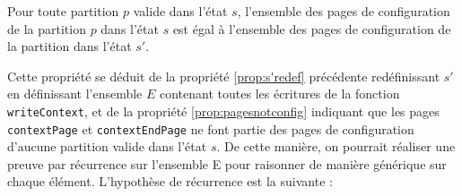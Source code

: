 			\begin{theorem}
				\label{prop:sameconfigpages}
				Pour toute partition $p$ valide dans l'état $s$, l'ensemble des pages de configuration de la partition $p$ dans l'état $s$ est égal à l'ensemble des pages de configuration de la partition dans l'état $s'$.
			\end{theorem}

			Cette propriété se déduit de la propriété \ref{prop:s'redef} précédente redéfinissant $s'$ en définissant l'ensemble $E$ contenant toutes les écritures de la fonction \texttt{writeContext}, et de la propriété \ref{prop:pagesnotconfig} indiquant que les pages \texttt{contextPage} et \texttt{contextEndPage} ne font partie des pages de configuration d'aucune partition valide dans l'état $s$.
			De cette manière, on pourrait réaliser une preuve par récurrence sur l'ensemble E pour raisonner de manière générique sur chaque élément. L'hypothèse de récurrence est la suivante :

